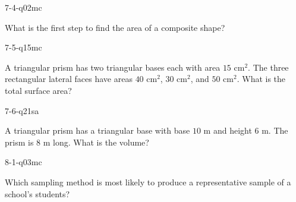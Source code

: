 \begin{practiceQuestion}{7-4-q02}{mc}
\begin{questionText}
What is the first step to find the area of a composite shape?
\end{questionText}
\end{practiceQuestion}

\begin{practiceQuestion}{7-5-q15}{mc}
\begin{questionText}
A triangular prism has two triangular bases each with area $15$ cm$^2$. The three rectangular lateral faces have areas $40$ cm$^2$, $30$ cm$^2$, and $50$ cm$^2$. What is the total surface area?
\end{questionText}
\end{practiceQuestion}

\begin{practiceQuestion}{7-6-q21}{sa}
\begin{questionText}
A triangular prism has a triangular base with base $10$ m and height $6$ m. The prism is $8$ m long. What is the volume?
\end{questionText}
\end{practiceQuestion}

\begin{practiceQuestion}{8-1-q03}{mc}
\begin{questionText}
Which sampling method is most likely to produce a representative sample of a school's students?
\end{questionText}
\end{practiceQuestion}

